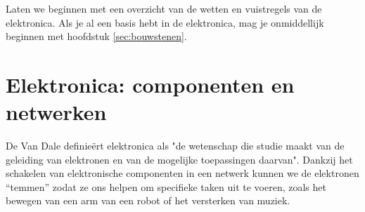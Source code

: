 \documentclass{article}
\begin{document}



		Laten we beginnen met een overzicht van de wetten en vuistregels van de elektronica. Als je al een basis hebt in de elektronica, mag je onmiddellijk beginnen met hoofdstuk \ref{sec:bouwstenen}.
	\section{Elektronica: componenten en netwerken}

		De Van Dale definie\"ert elektronica als "de wetenschap die studie maakt van de geleiding van elektronen en van de mogelijke toepassingen daarvan".
		Dankzij het schakelen van elektronische componenten in een netwerk kunnen we de elektronen ``temmen'' zodat ze ons helpen om specifieke taken uit te voeren, zoals het bewegen van een arm van een robot of het versterken van muziek.

\end{document}
